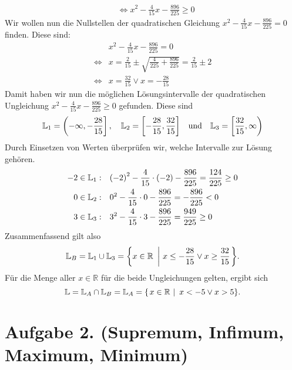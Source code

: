 \documentclass[german,12pt]{homework}
\newcommand{\RR}{\mathbb{R}}
\newcommand{\LL}{\mathbb{L}}
\DeclarePairedDelimiter{\enbrace}{(}{)}
\DeclarePairedDelimiter{\benbrace}{[}{]}
\DeclarePairedDelimiter{\penbrace}{\{}{\}}
\begin{document}
\begin{enumerate}
\begin{align*}
            &\iff x^2 - \frac{4}{15}x - \frac{896}{225} \ge 0
        \end{align*}
        Wir wollen nun die Nullstellen der quadratischen Gleichung \(x^2 -
        \frac{4}{15}x - \frac{896}{225} = 0\) finden. Diese sind:
        \begin{align*}
            &x^2 - \frac{4}{15}x - \frac{896}{225} = 0\\
            \iff&x = \frac{2}{15} \pm \sqrt{\frac{4}{225} + \frac{896}{225}} =
            \frac{2}{15} \pm 2\\
            \iff&x = \frac{32}{15} \lor x = -\frac{28}{15}
        \end{align*}
        Damit haben wir nun die möglichen Lösungsintervalle der quadratischen
        Ungleichung \(x^2 - \frac{4}{15}x - \frac{896}{225} \ge 0\) gefunden.
        Diese sind
        \[\LL_1 = \left(-\infty, -\frac{28}{15}\right], \quad \LL_2 =
        \benbrace*{-\frac{28}{15}, \frac{32}{15}} \quad \text{und} \quad \LL_3
        = \left[\frac{32}{15}, \infty\right)\]
        Durch Einsetzen von Werten überprüfen wir, welche Intervalle zur Lösung
        gehören.
        \begin{align*}
            -2 \in \LL_1: \quad &\enbrace*{-2}^2 - \frac{4}{15} \cdot
            \enbrace*{-2} - \frac{896}{225} = \frac{124}{225} \ge 0\\
            0 \in \LL_2: \quad &0^2 - \frac{4}{15} \cdot 0 - \frac{896}{225} = -
            \frac{896}{225} < 0\\
            3 \in \LL_3: \quad &3^2 - \frac{4}{15} \cdot 3 - \frac{896}{225} =
            \frac{949}{225} \ge 0
        \end{align*}
        Zusammenfassend gilt also
        \[\LL_B = \LL_1 \cup \LL_3 = \penbrace*{x \in \RR\ \left|\ x \le -
        \frac{28}{15} \lor x \ge \frac{32}{15}\right.}.\]
        Für die Menge aller \(x \in \RR\) für die beide Ungleichungen gelten,
        ergibt sich
        \[\LL = \LL_A \cap \LL_B = \LL_A = \penbrace*{\left.x \in \RR\ \right|\
        x < -5 \lor x > 5}.\]
    \end{enumerate}

    \section*{Aufgabe 2. (Supremum, Infimum, Maximum, Minimum)}
\end{document}
